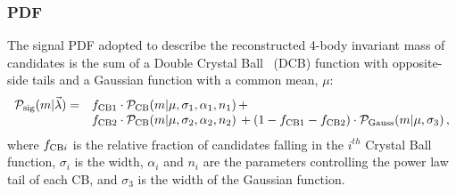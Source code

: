 \subsubsection{\BdToKstJPsmm PDF}

The signal PDF adopted to describe the reconstructed 4-body invariant mass of \BdToKstJPsmm candidates is the 
sum of a Double Crystal Ball~\cite{Skwarnicki:1986xj} (DCB) function with opposite-side tails and a Gaussian function with 
a common mean, $\mu$:
%
\begin{equation*}
\begin{array}{rl}
\mathcal{P}_{\rm sig}(m | \vec{\lambda}) = & 
f_{\rm CB1} \cdot \mathcal{P}_{\rm CB}(m | \mu, \sigma_1, \alpha_1, n_1) \, + \\
& f_{\rm CB2} \cdot \mathcal{P}_{\rm CB}(m | \mu, \sigma_2, \alpha_2, n_2) \, 
+ (1 - f_{\rm CB1} -f_{\rm CB2}) \cdot \mathcal{P}_{\rm Gauss}(m | \mu, \sigma_3) \, ,
\end{array}
\end{equation*}
where $f_{{\rm CB}i}$ is the relative fraction of candidates falling in the $i^{th}$ Crystal Ball function, $\sigma_i$ is the width, $\alpha_i$ and $n_i$ are the parameters controlling the power law tail of each CB, and $\sigma_3$ is the width of the Gaussian function.


